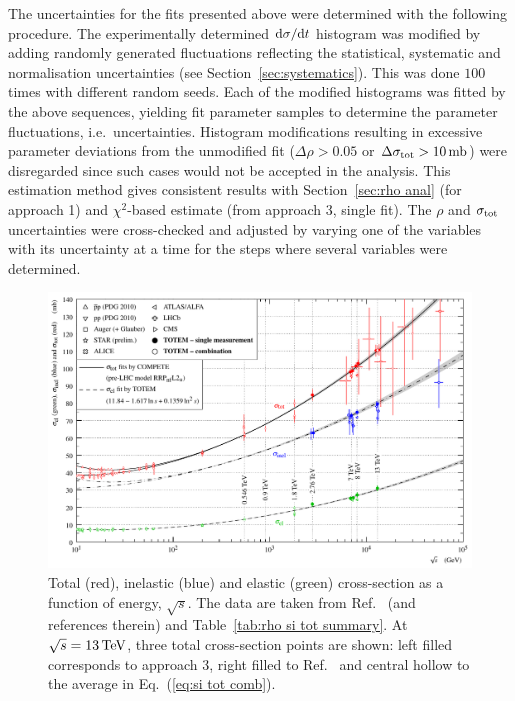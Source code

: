 The uncertainties for the fits presented above were determined with the following procedure. The experimentally determined ${\rm d}\sigma/{\rm d} t$ histogram was modified by adding randomly generated fluctuations reflecting the statistical, systematic and normalisation uncertainties (see Section~\ref{sec:systematics}). This was done $100$ times with different random seeds. Each of the modified histograms was fitted by the above sequences, yielding fit parameter samples to determine the parameter fluctuations, i.e.~uncertainties. Histogram modifications resulting in excessive parameter deviations from the unmodified fit ($\Delta\rho > 0.05$ or $\Delta\sigma_{\rm tot} > 10\,{\rm mb}$) were disregarded since such cases would not be accepted in the analysis. This estimation method gives consistent results with Section~\ref{sec:rho anal} (for approach 1) and $\chi^2$-based estimate (from approach 3, single fit). The $\rho$ and $\sigma_{\rm tot}$ uncertainties were cross-checked and adjusted by varying one of the variables with its uncertainty at a time for the steps where several variables were determined.

\begin{figure}
\begin{center}
\includegraphics{fig/sigma_tot_el_inel_vs_s.pdf}
\caption{%
Total (red), inelastic (blue) and elastic (green) cross-section as a function of energy, $\sqrt s$. The data are taken from Ref.~\cite{totem-13tev-90m} (and references therein) and Table~\ref{tab:rho si tot summary}. At $\sqrt s = 13\,{\rm TeV}$, three total cross-section points are shown: left filled corresponds to approach 3, right filled to Ref.~\cite{totem-13tev-90m} and central hollow to the average in Eq.~(\ref{eq:si tot comb}).
}
\label{fig:si tot inel el}
\end{center}
\end{figure}

